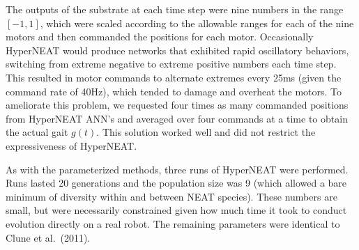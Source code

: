 
The outputs of the substrate at each time step were nine numbers in
the range $[-1,1]$, which were scaled according to the allowable
ranges for each of the nine motors and then commanded
the positions for each motor.  Occasionally HyperNEAT would produce networks that
exhibited rapid oscillatory behaviors, switching from extreme negative to extreme positive numbers each time step.  This resulted in motor
commands to alternate extremes every 25ms (given the command rate of
40Hz), which tended to damage and overheat the motors.  To ameliorate
this problem, we requested four times as many commanded
positions from HyperNEAT ANN's and averaged over four commands at a time to
obtain the actual gait $g(t)$.  This solution worked well and did not restrict the expressiveness of HyperNEAT.

As with the parameterized methods, three runs of HyperNEAT
were performed. Runs lasted 20 generations and the population size was 9 (which allowed a bare minimum of diversity within and between NEAT species).  These numbers are small, but were necessarily
constrained given how much time it took to conduct evolution directly
on a real robot. The remaining parameters were identical to Clune et
al.~(2011).
  


